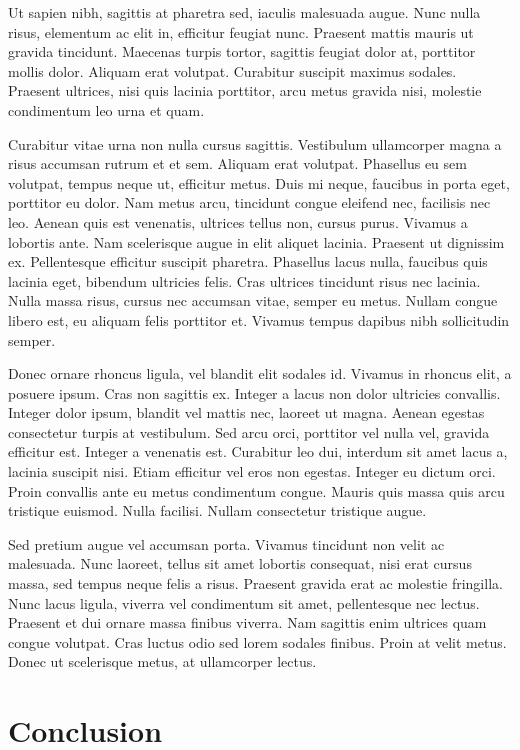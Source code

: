 \documentclass[a4paper]{memoir}
\begin{document}
Ut sapien nibh, sagittis at pharetra sed, iaculis malesuada augue. Nunc nulla risus, elementum ac elit in, efficitur feugiat nunc. Praesent mattis mauris ut gravida tincidunt. Maecenas turpis tortor, sagittis feugiat dolor at, porttitor mollis dolor. Aliquam erat volutpat. Curabitur suscipit maximus sodales. Praesent ultrices, nisi quis lacinia porttitor, arcu metus gravida nisi, molestie condimentum leo urna et quam. 

Curabitur vitae urna non nulla cursus sagittis. Vestibulum ullamcorper magna a risus accumsan rutrum et et sem. Aliquam erat volutpat. Phasellus eu sem volutpat, tempus neque ut, efficitur metus. Duis mi neque, faucibus in porta eget, porttitor eu dolor. Nam metus arcu, tincidunt congue eleifend nec, facilisis nec leo. Aenean quis est venenatis, ultrices tellus non, cursus purus. Vivamus a lobortis ante. Nam scelerisque augue in elit aliquet lacinia. Praesent ut dignissim ex. Pellentesque efficitur suscipit pharetra. Phasellus lacus nulla, faucibus quis lacinia eget, bibendum ultricies felis. Cras ultrices tincidunt risus nec lacinia. Nulla massa risus, cursus nec accumsan vitae, semper eu metus. Nullam congue libero est, eu aliquam felis porttitor et. Vivamus tempus dapibus nibh sollicitudin semper. 

Donec ornare rhoncus ligula, vel blandit elit sodales id. Vivamus in rhoncus elit, a posuere ipsum. Cras non sagittis ex. Integer a lacus non dolor ultricies convallis. Integer dolor ipsum, blandit vel mattis nec, laoreet ut magna. Aenean egestas consectetur turpis at vestibulum. Sed arcu orci, porttitor vel nulla vel, gravida efficitur est. Integer a venenatis est. Curabitur leo dui, interdum sit amet lacus a, lacinia suscipit nisi. Etiam efficitur vel eros non egestas. Integer eu dictum orci. Proin convallis ante eu metus condimentum congue. Mauris quis massa quis arcu tristique euismod. Nulla facilisi. Nullam consectetur tristique augue. 

Sed pretium augue vel accumsan porta. Vivamus tincidunt non velit ac malesuada. Nunc laoreet, tellus sit amet lobortis consequat, nisi erat cursus massa, sed tempus neque felis a risus. Praesent gravida erat ac molestie fringilla. Nunc lacus ligula, viverra vel condimentum sit amet, pellentesque nec lectus. Praesent et dui ornare massa finibus viverra. Nam sagittis enim ultrices quam congue volutpat. Cras luctus odio sed lorem sodales finibus. Proin at velit metus. Donec ut scelerisque metus, at ullamcorper lectus. 

\chapter*{Conclusion}
\label{conclusion}
\end{document}
